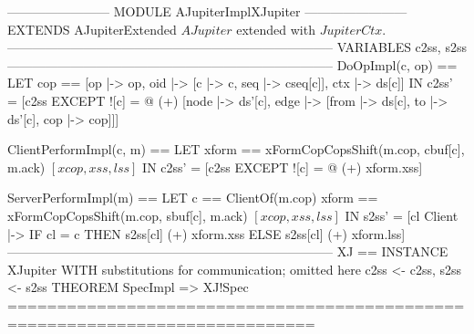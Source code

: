 \documentclass{article}
\begin{document}
\begin{tla}
------------------------ MODULE AJupiterImplXJupiter ------------------------
EXTENDS AJupiterExtended \* $AJupiter$ extended with $JupiterCtx$.
-----------------------------------------------------------------------------
VARIABLES c2ss, s2ss
-----------------------------------------------------------------------------
DoOpImpl(c, op) == 
    LET cop == [op |-> op, oid |-> [c |-> c, seq |-> cseq[c]], ctx |-> ds[c]] 
    IN  c2ss' = [c2ss EXCEPT ![c] = 
                     @ (+) [node |-> {ds'[c]},
                            edge |-> {[from |-> ds[c], to |-> ds'[c], cop |-> cop]}]]

ClientPerformImpl(c, m) ==
    LET xform == xFormCopCopsShift(m.cop, cbuf[c], m.ack) \* $[xcop, xss, lss]$
    IN  c2ss' = [c2ss EXCEPT ![c] = @ (+) xform.xss]

ServerPerformImpl(m) ==
    LET c == ClientOf(m.cop)
        xform == xFormCopCopsShift(m.cop, sbuf[c], m.ack) \* $[xcop, xss, lss]$
    IN  s2ss' = [cl \in Client |-> IF cl = c THEN s2ss[cl] (+) xform.xss 
                                             ELSE s2ss[cl] (+) xform.lss]
-----------------------------------------------------------------------------
XJ == INSTANCE XJupiter WITH \* substitutions for communication; omitted here
         c2ss <- c2ss, s2ss <- s2ss
THEOREM SpecImpl => XJ!Spec
=============================================================================
\end{tla}
\end{document}
